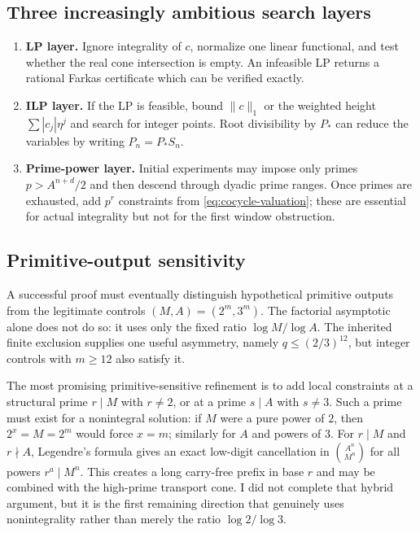 \documentclass[11pt,oneside]{article}
\theoremstyle{definition}
\theoremstyle{remark}
\begin{document}
\subsection{Three increasingly ambitious search layers}

\begin{enumerate}
\item \textbf{LP layer.}  Ignore integrality of $c$, normalize one linear functional, and test
whether the real cone intersection is empty.  An infeasible LP returns a rational Farkas
certificate which can be verified exactly.

\item \textbf{ILP layer.}  If the LP is feasible, bound $\|c\|_1$ or the weighted height
$\sum|c_j|\eta^j$ and search for integer points.  Root divisibility by $P_*$ can reduce the
variables by writing $P_n=P_*S_n$.

\item \textbf{Prime-power layer.}  Initial experiments may impose only primes
$p>A^{n+d}/2$ and then descend through dyadic prime ranges.  Once primes are exhausted, add
$p^r$ constraints from \eqref{eq:cocycle-valuation}; these are essential for actual
integrality but not for the first window obstruction.
\end{enumerate}

\subsection{Primitive-output sensitivity}

A successful proof must eventually distinguish hypothetical primitive outputs from the
legitimate controls $(M,A)=(2^m,3^m)$.  The factorial asymptotic alone does not do so: it uses
only the fixed ratio $\log M/\log A$.  The inherited finite exclusion supplies one useful
asymmetry, namely $q\le(2/3)^{12}$, but integer controls with $m\ge12$ also satisfy it.

The most promising primitive-sensitive refinement is to add local constraints at a
structural prime $r\mid M$ with $r\ne2$, or at a prime $s\mid A$ with $s\ne3$.  Such a prime
must exist for a nonintegral solution: if $M$ were a pure power of $2$, then
$2^x=M=2^m$ would force $x=m$; similarly for $A$ and powers of $3$.  For $r\mid M$ and
$r\nmid A$, Legendre's formula gives an exact low-digit cancellation in
$\binom{A^n}{M^n}$ for all powers $r^a\mid M^n$.  This creates a long carry-free prefix in
base $r$ and may be combined with the high-prime transport cone.  I did not complete that
hybrid argument, but it is the first remaining direction that genuinely uses nonintegrality
rather than merely the ratio $\log2/\log3$.
\end{document}
